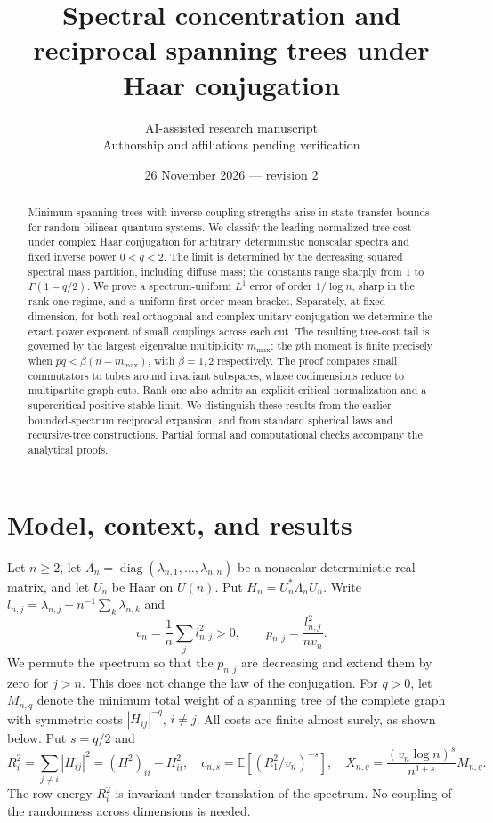 \documentclass[11pt]{article}
\title{Spectral concentration and reciprocal spanning trees under Haar conjugation}
\author{AI-assisted research manuscript\\\small Authorship and affiliations pending verification}
\date{26 November 2026 --- revision 2}
\newcommand{\E}{\mathbb E}
\newcommand{\diag}{\operatorname{diag}}
\begin{document}
\maketitle
\begin{abstract}
Minimum spanning trees with inverse coupling strengths arise in state-transfer bounds for random bilinear quantum systems. We classify the leading normalized tree cost under complex Haar conjugation for arbitrary deterministic nonscalar spectra and fixed inverse power $0<q<2$. The limit is determined by the decreasing squared spectral mass partition, including diffuse mass; the constants range sharply from $1$ to $\Gamma(1-q/2)$. We prove a spectrum-uniform $L^1$ error of order $1/\log n$, sharp in the rank-one regime, and a uniform first-order mean bracket. Separately, at fixed dimension, for both real orthogonal and complex unitary conjugation we determine the exact power exponent of small couplings across each cut. The resulting tree-cost tail is governed by the largest eigenvalue multiplicity $m_{\max}$: the $p$th moment is finite precisely when $pq<\beta(n-m_{\max})$, with $\beta=1,2$ respectively. The proof compares small commutators to tubes around invariant subspaces, whose codimensions reduce to multipartite graph cuts. Rank one also admits an explicit critical normalization and a supercritical positive stable limit. We distinguish these results from the earlier bounded-spectrum reciprocal expansion, and from standard spherical laws and recursive-tree constructions. Partial formal and computational checks accompany the analytical proofs.
\end{abstract}

\section{Model, context, and results}
Let $n\ge2$, let $\Lambda_n=\diag(\lambda_{n,1},\ldots,\lambda_{n,n})$ be a nonscalar deterministic real matrix, and let $U_n$ be Haar on $U(n)$. Put $H_n=U_n^*\Lambda_n U_n$. Write $l_{n,j}=\lambda_{n,j}-n^{-1}\sum_k\lambda_{n,k}$ and
\[
v_n=\frac1n\sum_j l_{n,j}^2>0,\qquad
p_{n,j}=\frac{l_{n,j}^2}{nv_n}.
\]
We permute the spectrum so that the $p_{n,j}$ are decreasing and extend them by zero for $j>n$. This does not change the law of the conjugation. For $q>0$, let $M_{n,q}$ denote the minimum total weight of a spanning tree of the complete graph with symmetric costs $|H_{ij}|^{-q}$, $i\ne j$. All costs are finite almost surely, as shown below. Put $s=q/2$ and
\begin{equation}
R_i^2=\sum_{j\ne i}|H_{ij}|^2=(H^2)_{ii}-H_{ii}^2,\quad
c_{n,s}=\E[(R_1^2/v_n)^{-s}],\quad
X_{n,q}=\frac{(v_n\log n)^s}{n^{1+s}}M_{n,q}.
\label{eq:normalization}
\end{equation}
The row energy $R_i^2$ is invariant under translation of the spectrum. No coupling of the randomness across dimensions is needed.
\end{document}
